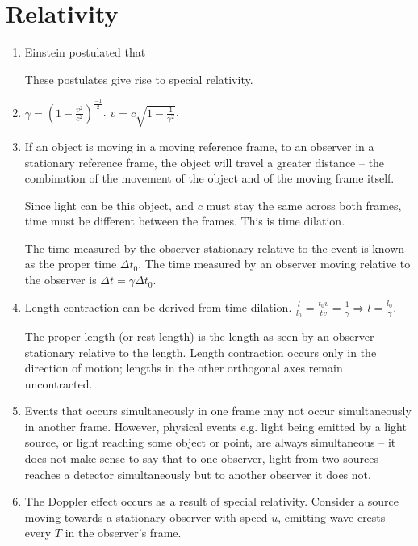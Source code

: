 \chapter{Relativity}
\begin{enumerate}
    \item Einstein postulated that
    These postulates give rise to special relativity.
    \item \(\gamma = \left(1-\frac{v^2}{c^2}\right)^{\frac{-1}{2}}\). \(v = c\sqrt{1 - \frac{1}{\gamma^2}}\).
    \item If an object is moving in a moving reference frame, to an observer in a stationary reference frame, the object will travel a greater distance -- the combination of the movement of the object and of the moving frame itself.
    
    Since light can be this object, and \(c\) must stay the same across both frames, time must be different between the frames. This is time dilation.
    
    The time measured by the observer stationary relative to the event is known as the proper time \(\Delta t_0\). The time measured by an observer moving relative to the observer is \(\Delta t = \gamma\Delta t_0\).
    \item Length contraction can be derived from time dilation. \(\frac{l}{l_0} = \frac{t_0v}{tv} = \frac{1}{\gamma} \Rightarrow l = \frac{l_0}{\gamma}\).
    
    The proper length (or rest length) is the length as seen by an observer stationary relative to the length. Length contraction occurs only in the direction of motion; lengths in the other orthogonal axes remain uncontracted.
    \item Events that occurs simultaneously in one frame may not occur simultaneously in another frame. However, physical events e.g. light being emitted by a light source, or light reaching some object or point, are always simultaneous -- it does not make sense to say that to one observer, light from two sources reaches a detector simultaneously but to another observer it does not.
    \item The Doppler effect occurs as a result of special relativity. Consider a source moving towards a stationary observer with speed \(u\), emitting wave crests every \(T\) in the observer's frame.
    

\end{enumerate}
